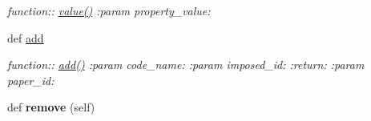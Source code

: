 \begin{DoxyCompactItemize}
\begin{DoxyCompactList}\small\item\em function\+:\+: \hyperlink{classplume-creator_1_1src_1_1plume_1_1data_1_1property_1_1db__property_1_1_db_property_a8ab420494d1195b6efb82da63d26b47d}{value()} \+:param property\+\_\+value\+: \end{DoxyCompactList}\item 
def \hyperlink{classplume-creator_1_1src_1_1plume_1_1data_1_1property_1_1db__property_1_1_db_property_a65c07f8eb6e316ee3d5f5c64427356a4}{add}\hypertarget{classplume-creator_1_1src_1_1plume_1_1data_1_1property_1_1db__property_1_1_db_property_a65c07f8eb6e316ee3d5f5c64427356a4}{}\label{classplume-creator_1_1src_1_1plume_1_1data_1_1property_1_1db__property_1_1_db_property_a65c07f8eb6e316ee3d5f5c64427356a4}

\begin{DoxyCompactList}\small\item\em function\+:\+: \hyperlink{classplume-creator_1_1src_1_1plume_1_1data_1_1property_1_1db__property_1_1_db_property_a65c07f8eb6e316ee3d5f5c64427356a4}{add()} \+:param code\+\_\+name\+: \+:param imposed\+\_\+id\+: \+:return\+: \+:param paper\+\_\+id\+: \end{DoxyCompactList}\item 
def {\bfseries remove} (self)\hypertarget{classplume-creator_1_1src_1_1plume_1_1data_1_1property_1_1db__property_1_1_db_property_a5f470611c4b32df2c345eba780db8842}{}\label{classplume-creator_1_1src_1_1plume_1_1data_1_1property_1_1db__property_1_1_db_property_a5f470611c4b32df2c345eba780db8842}

\end{DoxyCompactItemize}
